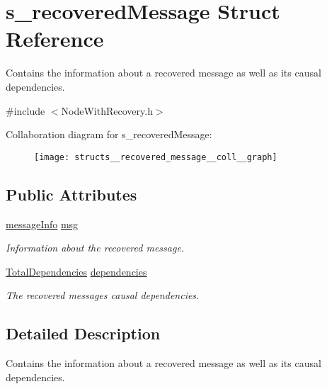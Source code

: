 \hypertarget{structs__recovered_message}{}\section{s\+\_\+recovered\+Message Struct Reference}
\label{structs__recovered_message}


Contains the information about a recovered message as well as its causal dependencies.  




{\ttfamily \#include $<$Node\+With\+Recovery.\+h$>$}



Collaboration diagram for s\+\_\+recovered\+Message\+:\nopagebreak
\begin{figure}[H]
\begin{center}
\leavevmode
\texttt{[image: structs\_\_recovered\_message\_\_coll\_\_graph]}
\end{center}
\end{figure}
\subsection*{Public Attributes}
\begin{DoxyCompactItemize}
\item 
\hyperlink{structures_8h_a7e7bdc1d2fff8a9436f2f352b2711ed6}{message\+Info} \hyperlink{structs__recovered_message_a585360581eb2222b2a9ec5b91076054a}{msg}
\begin{DoxyCompactList}\small\item\em Information about the recovered message. \end{DoxyCompactList}\item 
\hyperlink{class_total_dependencies}{Total\+Dependencies} \hyperlink{structs__recovered_message_a95db2608749458c7b7e70bd5b612ba2d}{dependencies}
\begin{DoxyCompactList}\small\item\em The recovered message\textquotesingle{}s causal dependencies. \end{DoxyCompactList}\end{DoxyCompactItemize}


\subsection{Detailed Description}
Contains the information about a recovered message as well as its causal dependencies. 



